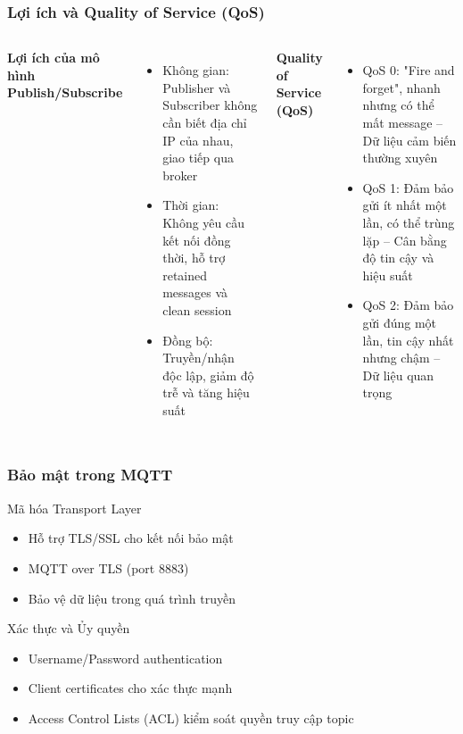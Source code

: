 \begin{frame}
\frametitle{Lợi ích và Quality of Service (QoS)}

\begin{columns}[T]
    \textbf{Lợi ích của mô hình Publish/Subscribe}
    \begin{itemize}
        \item Không gian: Publisher và Subscriber không cần biết địa chỉ IP của nhau, giao tiếp qua broker
        \item Thời gian: Không yêu cầu kết nối đồng thời, hỗ trợ retained messages và clean session
        \item Đồng bộ: Truyền/nhận độc lập, giảm độ trễ và tăng hiệu suất
    \end{itemize}

    \textbf{Quality of Service (QoS)}
    \begin{itemize}
        \item QoS 0: "Fire and forget", nhanh nhưng có thể mất message – Dữ liệu cảm biến thường xuyên
        \item QoS 1: Đảm bảo gửi ít nhất một lần, có thể trùng lặp – Cân bằng độ tin cậy và hiệu suất
        \item QoS 2: Đảm bảo gửi đúng một lần, tin cậy nhất nhưng chậm – Dữ liệu quan trọng
    \end{itemize}

\end{columns}

\end{frame}
\begin{frame}
\frametitle{Bảo mật trong MQTT}

\begin{block}{Mã hóa Transport Layer}
\begin{itemize}
\item Hỗ trợ TLS/SSL cho kết nối bảo mật
\item MQTT over TLS (port 8883)
\item Bảo vệ dữ liệu trong quá trình truyền
\end{itemize}
\end{block}

\begin{block}{Xác thực và Ủy quyền}
\begin{itemize}
\item Username/Password authentication
\item Client certificates cho xác thực mạnh
\item Access Control Lists (ACL) kiểm soát quyền truy cập topic
\end{itemize}
\end{block}
\end{frame}


